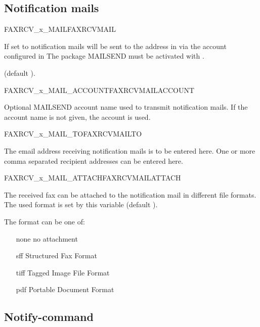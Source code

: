 \subsection{Notification mails}

\begin {description}

 {FAXRCV\_x\_MAIL}{FAXRCVMAIL}

  If set to  notification mails will be sent to the address in
   via the account 
  configured in  
  The package MAILSEND must be activated with .
  
  (default ). 

 {FAXRCV\_x\_MAIL\_ACCOUNT}{FAXRCVMAILACCOUNT}

  Optional MAILSEND account name used to transmit notification mails.
  If the account name is not given, the account  is used.

 {FAXRCV\_x\_MAIL\_TO}{FAXRCVMAILTO}

  The email address receiving notification mails is to be entered here.
  One or more comma separated recipient addresses can be entered here.

 {FAXRCV\_x\_MAIL\_ATTACH}{FAXRCVMAILATTACH}

  The received fax can be attached to the notification mail in different 
  file formats.
  The used format is set by this variable (default ). 
   
  The format can be one of:
  \begin{itemize}
    \item[none] no attachment
    \item[sff] Structured Fax Format
    \item[tiff] Tagged Image File Format
    \item[pdf] Portable Document Format
  \end{itemize}
  
\end {description}

\subsection{Notify-command}

